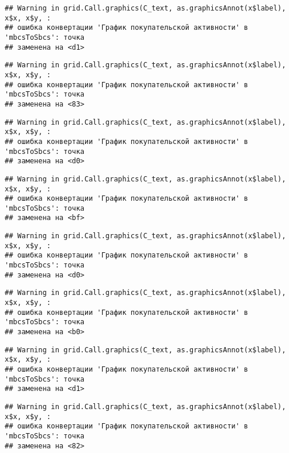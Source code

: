 \documentclass[
]{article}
\begin{document}
\begin{verbatim}
## Warning in grid.Call.graphics(C_text, as.graphicsAnnot(x$label), x$x, x$y, :
## ошибка конвертации 'График покупательской активности' в 'mbcsToSbcs': точка
## заменена на <d1>
\end{verbatim}

\begin{verbatim}
## Warning in grid.Call.graphics(C_text, as.graphicsAnnot(x$label), x$x, x$y, :
## ошибка конвертации 'График покупательской активности' в 'mbcsToSbcs': точка
## заменена на <83>
\end{verbatim}

\begin{verbatim}
## Warning in grid.Call.graphics(C_text, as.graphicsAnnot(x$label), x$x, x$y, :
## ошибка конвертации 'График покупательской активности' в 'mbcsToSbcs': точка
## заменена на <d0>
\end{verbatim}

\begin{verbatim}
## Warning in grid.Call.graphics(C_text, as.graphicsAnnot(x$label), x$x, x$y, :
## ошибка конвертации 'График покупательской активности' в 'mbcsToSbcs': точка
## заменена на <bf>
\end{verbatim}

\begin{verbatim}
## Warning in grid.Call.graphics(C_text, as.graphicsAnnot(x$label), x$x, x$y, :
## ошибка конвертации 'График покупательской активности' в 'mbcsToSbcs': точка
## заменена на <d0>
\end{verbatim}

\begin{verbatim}
## Warning in grid.Call.graphics(C_text, as.graphicsAnnot(x$label), x$x, x$y, :
## ошибка конвертации 'График покупательской активности' в 'mbcsToSbcs': точка
## заменена на <b0>
\end{verbatim}

\begin{verbatim}
## Warning in grid.Call.graphics(C_text, as.graphicsAnnot(x$label), x$x, x$y, :
## ошибка конвертации 'График покупательской активности' в 'mbcsToSbcs': точка
## заменена на <d1>
\end{verbatim}

\begin{verbatim}
## Warning in grid.Call.graphics(C_text, as.graphicsAnnot(x$label), x$x, x$y, :
## ошибка конвертации 'График покупательской активности' в 'mbcsToSbcs': точка
## заменена на <82>
\end{verbatim}
\end{document}
